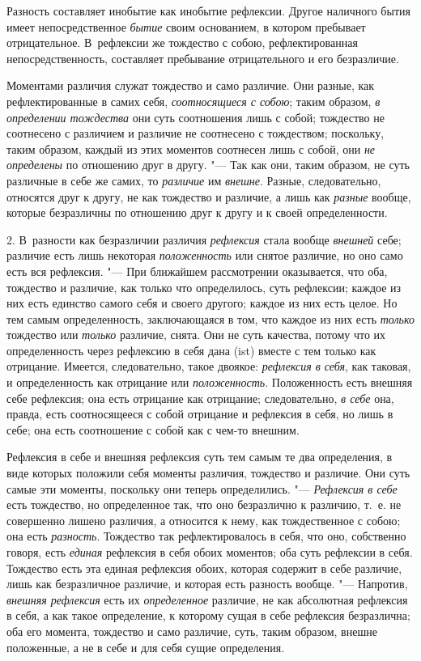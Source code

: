Разность составляет инобытие как инобытие рефлексии. Другое наличного бытия
имеет непосредственное {\em бытие} своим основанием, в
котором пребывает отрицательное. В~рефлексии же тождество с собою,
рефлектированная непосредственность, составляет пребывание отрицательного и
его безразличие.

Моментами различия служат тождество и само различие. Они разные, как
рефлектированные в самих себя, {\em соотносящиеся с
собою}; таким образом, {\em в определении тождества}
они суть соотношения лишь с собой; тождество не соотнесено с различием и
различие не соотнесено с тождеством; поскольку, таким образом, каждый из
этих моментов соотнесен лишь с собой, они {\em не
определены} по отношению друг в другу. "--- Так как они, таким образом, не
суть различные в себе же самих, то {\em различие} им
{\em внешне}. Разные, следовательно, относятся друг к
другу, не как тождество и различие, а лишь как
{\em разные} вообще, которые безразличны по отношению
друг к другу и к своей определенности.

2. В~разности как безразличии различия {\em рефлексия}
стала вообще {\em внешней} себе; различие есть лишь
некоторая {\em положенность} или снятое различие, но
оно само есть вся рефлексия. "--- При ближайшем рассмотрении оказывается, что
оба, тождество и различие, как только что определилось, суть рефлексии;
каждое из них есть единство самого себя и своего другого; каждое из них
есть целое. Но тем самым определенность, заключающаяся в том, что каждое из
них есть {\em только} тождество или
{\em только} различие, снята. Они не суть качества,
потому что их определенность через рефлексию в себя дана (ist) вместе с тем
только как отрицание. Имеется, следовательно, такое двоякое:
{\em рефлексия в себя}, как таковая, и определенность
как отрицание или {\em положенность}. Положенность есть
внешняя себе рефлексия; она есть отрицание как отрицание; следовательно,
{\em в себе} она, правда, есть соотносящееся с собой
отрицание и рефлексия в себя, но лишь в себе; она есть соотношение с собой
как с чем-то внешним.

Рефлексия в себе и внешняя рефлексия суть тем самым те два определения, в
виде которых положили себя моменты различия, тождество и различие. Они суть
самые эти моменты, поскольку они теперь определились. "---
{\em Рефлексия в себе} есть тождество, но определенное
так, что оно безразлично к различию, т.~е. не совершенно лишено различия, а
относится к нему, как тождественное с собою; она есть
{\em разность}. Тождество так рефлектировалось в себя,
что оно, собственно говоря, есть {\em единая} рефлексия
в себя обоих моментов; оба суть рефлексии в себя. Тождество есть эта единая
рефлексия обоих, которая содержит в себе различие, лишь как безразличное
различие, и которая есть разность вообще. "--- Напротив,
{\em внешняя рефлексия} есть их
{\em определенное} различие, не как абсолютная
рефлексия в себя, а как такое определение, к которому сущая в себе
рефлексия безразлична; оба его момента, тождество и само различие, суть,
таким образом, внешне положенные, а не в себе и для себя сущие определения.

